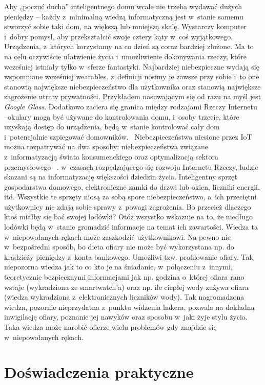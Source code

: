 \documentclass{xmgr}
\begin{document}
	Aby „poczuć ducha” inteligentnego domu wcale nie trzeba wydawać dużych pieniędzy – każdy z~minimalną wiedzą informatyczną jest w~stanie samemu stworzyć sobie taki dom, na większą lub mniejszą skalę. Wystarczy komputer i~dobry pomysł, aby przekształcić swoje cztery kąty w~coś wyjątkowego.
	Urządzenia, z~których korzystamy na co dzień są coraz bardziej złożone. Ma to na celu oczywiście ułatwienie życia i~umożliwienie dokonywania rzeczy, które wcześniej istniały tylko w~sferze fantastyki.
	Najbardziej niebezpieczne wydają się wspomniane wcześniej wearables. z~definicji nosimy je zawsze przy sobie i~to one stanowią największe niebezpieczeństwo dla użytkownika oraz stanowią największe zagrożenie utraty prywatności. Przykładem nasuwającym się od razu na myśl jest \emph{Google Glass}. Dodatkowo zaciera się granica między rodzajami Rzeczy Internetu –okulary mogą być używane do kontrolowania domu, i~osoby trzecie, które uzyskają dostęp do urządzenia, będą w~stanie kontrolować cały dom i~potencjalnie  szpiegować domowników.~ \cite{Kaspersky:2014:CMC}
	Niebezpieczeństwa niesione przez IoT można rozpatrywać na dwa sposoby: niebezpieczeństwa związane z~informatyzacją świata konsumenckiego oraz optymalizacją sektora przemysłowego~ \cite{Ks:2014:CMC}. w~czasach rozpędzającego się rozwoju Internetu Rzeczy, ludzie skazani są na informatyzację większości dziedzin życia. Inteligentny sprzęt gospodarstwa domowego, elektroniczne zamki do drzwi lub okien, liczniki energii, itd. Wszystkie te sprzęty niosą za sobą spore niebezpieczeństwo, a~ich przeciętni użytkownicy nie zdają sobie sprawy z~powagi zagrożenia. Bo przecież dlaczego ktoś miałby się bać swojej lodówki? Otóż wszystko wskazuje na to, że niedługo lodówki będą w~stanie gromadzić informacje na temat ich zawartości. Wiedza ta w~niepowołanych rękach może zaszkodzić użytkownikowi. Na pewno nie w~bezpośredni sposób, bo dieta ofiary nie może być wykorzystana np. do kradzieży pieniędzy z~konta bankowego. Umożliwi tzw. profilowanie ofiary. Tak niepozorna wiedza jak to co kto je na śniadanie, w~połączeniu z~innymi, teoretycznie bezpiecznymi informacjami jak np. godzina o~której ofiara rano wstaje (wykradziona ze smartwatch'a) oraz np. ile ciepłej wody zużywa ofiara (wiedza wykradziona z~elektronicznych liczników wody). Tak nagromadzona wiedza, pozornie nieprzydatna z~punktu widzenia hakera, pozwala na dokładną inwigilację ofiary, poznanie jej nawyków oraz sposobu w~jaki żyje stylu życia. Taka wiedza może narobić ofierze wielu problemów gdy znajdzie się w~niepowołanych rękach.

\chapter{Doświadczenia praktyczne}
\end{document}
